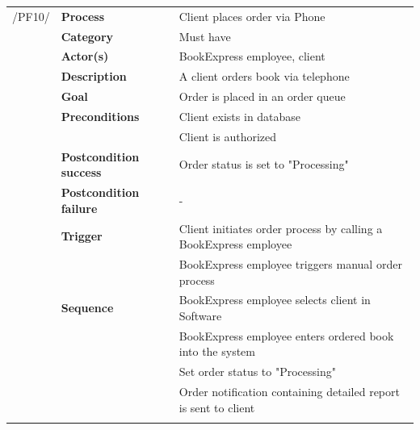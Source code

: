 \documentclass[11pt,a4paper,oneside,svgnames]{report}
\begin{document}
\noindent
\begin{tabular}{p{1.5cm}p{3cm}p{8cm}}
\cellcolor{white}	 /PF10/	& \textbf{Process} & Client places order via Phone\\ 
\cellcolor{white}		& \textbf{Category} & Must have\\
\cellcolor{white}		& \textbf{Actor(s)} & BookExpress employee, client\\ 
\cellcolor{white}		& \textbf{Description}	 & A client orders book via telephone\\ 
\cellcolor{white}		& \textbf{Goal} & Order is placed in an order queue\\
\cellcolor{white}		& \textbf{Preconditions} & Client exists in database\\
\cellcolor{white}		& & Client is authorized\\
\cellcolor{white}		& \textbf{Postcondition success} & Order status is set to "Processing"\\
\cellcolor{white}		& \textbf{Postcondition failure} & -\\
\cellcolor{white}		& \textbf{Trigger} & Client initiates order process by calling a BookExpress employee\\
\cellcolor{white}		& & BookExpress employee triggers manual order process\\
\cellcolor{white}		& \textbf{Sequence} & BookExpress employee selects client in Software\\
\cellcolor{white}		& & BookExpress employee enters ordered book into the system\\
\cellcolor{white}		& & Set order status to "Processing"\\
\cellcolor{white}		& & Order notification containing detailed report is sent to client\\
\cellcolor{white}\hfill \\
\end{tabular}
\end{document}
